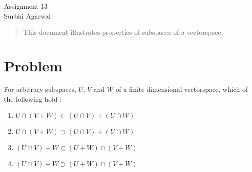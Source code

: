 \documentclass[journal,12pt]{IEEEtran}
\begin{document}
\let\StandardTheFigure\thefigure
\let\vec\mathbf

\renewcommand{\thefigure}{\theproblem}

\def\putbox#1#2#3{\makebox[0in][l]{\makebox[#1][l]{}\raisebox{\baselineskip}[0in][0in]{\raisebox{#2}[0in][0in]{#3}}}}
     \def\rightbox#1{\makebox[0in][r]{#1}}
     \def\centbox#1{\makebox[0in]{#1}}
     \def\topbox#1{\raisebox{-\baselineskip}[0in][0in]{#1}}
     \def\midbox#1{\raisebox{-0.5\baselineskip}[0in][0in]{#1}}
\vspace{3cm}
\begin{center}
\huge Assignment 13\\
\large Surbhi Agarwal\\
\end{center}
\renewcommand{\thefigure}{\theenumi}
\renewcommand{\thetable}{\theenumi}

\begin{abstract}
This document illustrates properties of subspaces of a vectorspace.
\end{abstract}

\section{Problem}
For arbitrary subspaces, $U$, $V$ and $W$ of a finite dimensional vectorspace, which of the following hold :
\begin{enumerate}
    \item $U \cap (V+W) \subset (U \cap V) + (U \cap W)$
    \item $U \cap (V+W) \supset (U \cap V) + (U \cap W)$
    \item $(U \cap V) + W \subset (U+W) \cap (V+W)$
    \item $(U \cap V) + W \supset (U+W) \cap (V+W)$
\end{enumerate}
\end{document}
